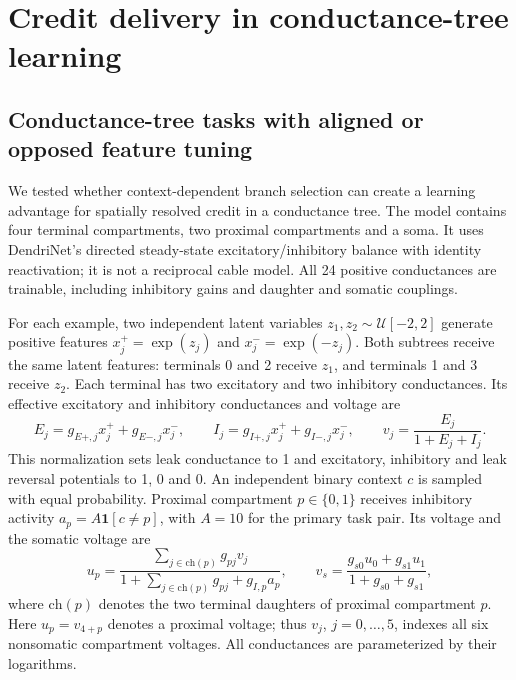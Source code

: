 \section{Credit delivery in conductance-tree learning}
\label{note:conductance_learning}

\subsection{Conductance-tree tasks with aligned or opposed feature tuning}
\label{sec:conductance-credit-demand}
We tested whether context-dependent branch selection can create a learning advantage for spatially resolved credit in a conductance tree. The model contains four terminal compartments, two proximal compartments and a soma. It uses DendriNet's directed steady-state excitatory/inhibitory balance with identity reactivation; it is not a reciprocal cable model. All 24 positive conductances are trainable, including inhibitory gains and daughter and somatic couplings.

For each example, two independent latent variables $z_1,z_2\sim\mathcal U[-2,2]$ generate positive features $x_j^+=\exp(z_j)$ and $x_j^-=\exp(-z_j)$. Both subtrees receive the same latent features: terminals 0 and 2 receive $z_1$, and terminals 1 and 3 receive $z_2$. Each terminal has two excitatory and two inhibitory conductances. Its effective excitatory and inhibitory conductances and voltage are
\begin{equation}
 E_j=g_{E+,j}x_j^++g_{E-,j}x_j^- ,\qquad
 I_j=g_{I+,j}x_j^++g_{I-,j}x_j^- ,\qquad
 v_j=\frac{E_j}{1+E_j+I_j}.
\end{equation}
This normalization sets leak conductance to 1 and excitatory, inhibitory and leak reversal potentials to 1, 0 and 0. An independent binary context $c$ is sampled with equal probability. Proximal compartment $p\in\{0,1\}$ receives inhibitory activity $a_p=A\mathbf 1[c\ne p]$, with $A=10$ for the primary task pair. Its voltage and the somatic voltage are
\begin{equation}
 u_p=\frac{\sum_{j\in\mathrm{ch}(p)}g_{pj}v_j}
 {1+\sum_{j\in\mathrm{ch}(p)}g_{pj}+g_{I,p}a_p},\qquad
 v_s=\frac{g_{s0}u_0+g_{s1}u_1}{1+g_{s0}+g_{s1}},
\end{equation}
where $\mathrm{ch}(p)$ denotes the two terminal daughters of proximal compartment $p$. Here $u_p=v_{4+p}$ denotes a proximal voltage; thus $v_j$, $j=0,\ldots,5$, indexes all six nonsomatic compartment voltages. All conductances are parameterized by their logarithms.

